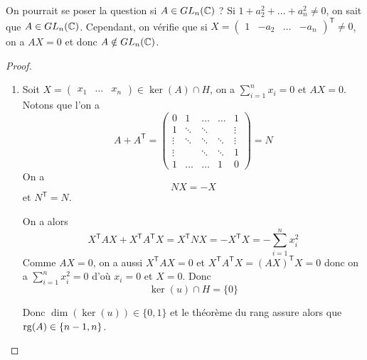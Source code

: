 \documentclass[12pt]{article}
\begin{document}
\begin{remark}
    On pourrait se poser la question si $A\in GL_{n}(\mathbb{C})$ ? Si $1+a_{2}^{2}+\dots+a_{n}^{2}\neq0$, on sait que $A\in GL_{n}(\mathbb{C})$. Cependant, on vérifie que si $X=\begin{pmatrix}
        1 & -a_{2}&\dots&-a_{n}
    \end{pmatrix}^{\mathsf{T}}\neq0$, on a $AX=0$ et donc $A\notin GL_{n}(\mathbb{C})$.
\end{remark}

\begin{proof}
    \phantom{}
    \begin{enumerate}
        \item Soit $X=\begin{pmatrix}
            x_{1}&\dots &x_{n}
        \end{pmatrix}\in \ker(A)\cap H$, on a $\sum_{i=1}^{n}x_{i}=0$ et $AX=0$. Notons que l'on a 
        \begin{equation}
            A+A^{\mathsf{T}}=
            \begin{pmatrix}
                0&1 &\dots & \dots& 1\\
                1 & \ddots & \ddots & & \vdots\\
                \vdots & \ddots & \ddots & \ddots & \vdots\\
                \vdots & & \ddots & \ddots & 1\\
                1 &\dots & \dots & 1 & 0
            \end{pmatrix}=N
        \end{equation}
        On a 
        \begin{equation}
            NX=-X
        \end{equation}
        et $N^{\mathsf{T}}=N$.

        On a alors 
        \begin{equation}
            X^{\mathsf{T}}AX+X^{\mathsf{T}}A^{\mathsf{T}}X=X^{\mathsf{T}}NX=-X^{\mathsf{T}}X=-\sum_{i=1}^{n}x_{i}^{2}
        \end{equation}
        Comme $AX=0$, on a aussi $X^{\mathsf{T}}AX=0$ et $X^{\mathsf{T}}A^{\mathsf{T}}X=(AX)^{\mathsf{T}}X=0$ donc on a $\sum_{i=1}^{n}x_{i}^{2}=0$ d'où $x_{i}=0$ et $X=0$. Donc 
        \begin{equation}
            \boxed{\ker(u)\cap H}=\lbrace 0\rbrace
        \end{equation}

        Donc $\dim(\ker(u))\in\lbrace0,1\rbrace$ et le théorème du rang assure alors que $\operatorname{rg}(A)\in\lbrace n-1,n\rbrace$.


\end{enumerate}
\end{proof}
\end{document}
